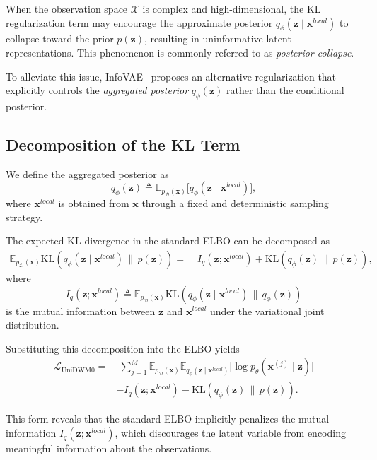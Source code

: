 \documentclass{article}
\theoremstyle{plain}
\theoremstyle{definition}
\theoremstyle{remark}
\begin{document}
When the observation space $\mathcal{X}$ is complex and high-dimensional,
the KL regularization term may encourage the approximate posterior
$q_\phi(\mathbf{z} \mid \mathbf{x}^{local})$ to collapse toward the prior
$p(\mathbf{z})$, resulting in uninformative latent representations.
This phenomenon is commonly referred to as \emph{posterior collapse}.

To alleviate this issue, InfoVAE~\cite{zhao2017infovae} proposes an alternative
regularization that explicitly controls the \emph{aggregated posterior}
$q_\phi(\mathbf{z})$ rather than the conditional posterior.

\subsection{Decomposition of the KL Term}

We define the aggregated posterior as
\[
q_\phi(\mathbf{z})
\triangleq
\mathbb{E}_{p_{\mathcal{D}}(\mathbf{x})}
\big[ q_\phi(\mathbf{z} \mid \mathbf{x}^{local}) \big],
\]
where $\mathbf{x}^{local}$ is obtained from $\mathbf{x}$ through a fixed and
deterministic sampling strategy.

The expected KL divergence in the standard ELBO can be decomposed as
\[
\begin{aligned}
\mathbb{E}_{p_{\mathcal{D}}(\mathbf{x})}
\mathrm{KL}\!\left(
q_\phi(\mathbf{z} \mid \mathbf{x}^{local})
\,\|\, p(\mathbf{z})
\right)
=&\;
I_{q}(\mathbf{z}; \mathbf{x}^{local})
+
\mathrm{KL}\!\left(
q_\phi(\mathbf{z}) \,\|\, p(\mathbf{z})
\right),
\end{aligned}
\]
where
\[
I_{q}(\mathbf{z}; \mathbf{x}^{local})
\triangleq
\mathbb{E}_{p_{\mathcal{D}}(\mathbf{x})}
\mathrm{KL}\!\left(
q_\phi(\mathbf{z} \mid \mathbf{x}^{local})
\,\|\, q_\phi(\mathbf{z})
\right)
\]
is the mutual information between $\mathbf{z}$ and $\mathbf{x}^{local}$ under
the variational joint distribution.

Substituting this decomposition into the ELBO yields
\[
\begin{aligned}
\mathcal{L}_{\mathrm{UniDWM0}}
=&\;
{\textstyle \sum_{j=1}^{M}}
\mathbb{E}_{p_{\mathcal{D}}(\mathbf{x})}
\mathbb{E}_{q_\phi(\mathbf{z} \mid \mathbf{x}^{local})}
\big[ \log p_\theta(\boldsymbol{x}^{(j)} \mid \mathbf{z}) \big] \\
&-
I_{q}(\mathbf{z}; \mathbf{x}^{local})
-
\mathrm{KL}\!\left(
q_\phi(\mathbf{z}) \,\|\, p(\mathbf{z})
\right).
\end{aligned}
\]

This form reveals that the standard ELBO implicitly penalizes the mutual
information $I_q(\mathbf{z}; \mathbf{x}^{local})$, which discourages the latent
variable from encoding meaningful information about the observations.
\end{document}
